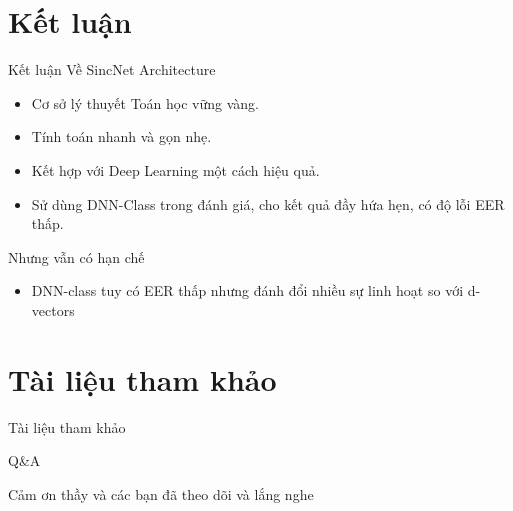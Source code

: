 \documentclass[notheorems, aspectratio=54]{beamer}
\begin{document}
\section{Kết luận}
\begin{frame}{Kết luận}
	Về SincNet Architecture
	\begin{itemize}
		\item Cơ sở lý thuyết Toán học vững vàng.
		\item Tính toán nhanh và gọn nhẹ.
		\item Kết hợp với Deep Learning một cách hiệu quả.
		\item Sử dùng DNN-Class trong đánh giá, cho kết quả đầy hứa hẹn, có độ lỗi EER thấp.
	\end{itemize}
	Nhưng vẫn có hạn chế
	\begin{itemize}
		\item DNN-class tuy có EER thấp nhưng đánh đổi nhiều sự linh hoạt so với d-vectors
	\end{itemize}
\end{frame}

\section{Tài liệu tham khảo}
\begin{frame}{Tài liệu tham khảo}
	\nocite{*}
	\newpage\cleardoublepage
	
\end{frame}


\begin{frame}{Q\&A}
	\begin{center}
		\Huge Cảm ơn thầy và các bạn đã theo dõi và lắng nghe
	\end{center}
\end{frame}
\end{document}
